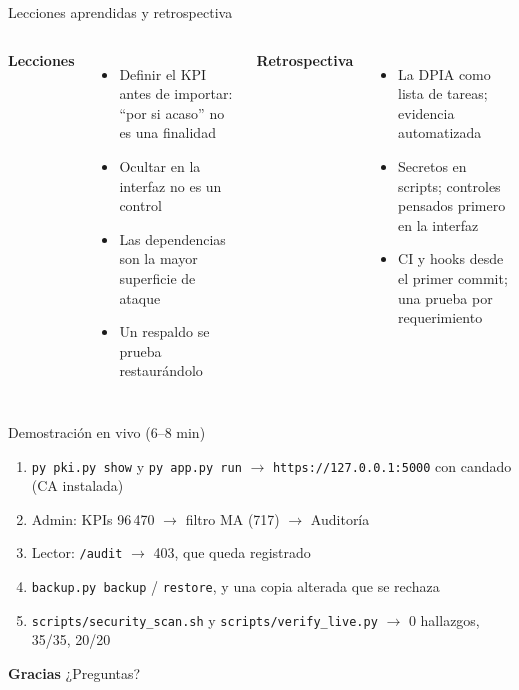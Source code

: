 \documentclass[aspectratio=169,11pt]{beamer}
\begin{document}
\begin{frame}{Lecciones aprendidas y retrospectiva}
\small
\begin{columns}[T,onlytextwidth]
\textbf{Lecciones}
\begin{itemize}\setlength\itemsep{1pt}
\item Definir el KPI antes de importar: ``por si acaso'' no es una finalidad
\item Ocultar en la interfaz no es un control
\item Las dependencias son la mayor superficie de ataque
\item Un respaldo se prueba restaurándolo
\end{itemize}
\textbf{Retrospectiva}
\begin{itemize}\setlength\itemsep{1pt}
\item[\textcolor{teal}{+}] La DPIA como lista de tareas; evidencia automatizada
\item[\textcolor{bad}{--}] Secretos en scripts; controles pensados primero en la interfaz
\item[\textcolor{teal}{$\rightarrow$}] CI y hooks desde el primer commit; una prueba por requerimiento
\end{itemize}
\end{columns}
\end{frame}

\begin{frame}{Demostración en vivo (6--8 min)}
\small
\begin{enumerate}\setlength\itemsep{2pt}
\item \texttt{py pki.py show} y \texttt{py app.py run} $\rightarrow$ \texttt{https://127.0.0.1:5000} con candado (CA instalada)
\item Admin: KPIs 96\,470 $\rightarrow$ filtro MA (717) $\rightarrow$ Auditoría
\item Lector: \texttt{/audit} $\rightarrow$ 403, que queda registrado
\item \texttt{backup.py backup} / \texttt{restore}, y una copia alterada que se rechaza
\item \texttt{scripts/security\_scan.sh} y \texttt{scripts/verify\_live.py} $\rightarrow$ 0 hallazgos, 35/35, 20/20
\end{enumerate}
\vfill
\centering\large\textbf{Gracias} \quad\normalsize\color{muted} ¿Preguntas?
\end{frame}
\end{document}
